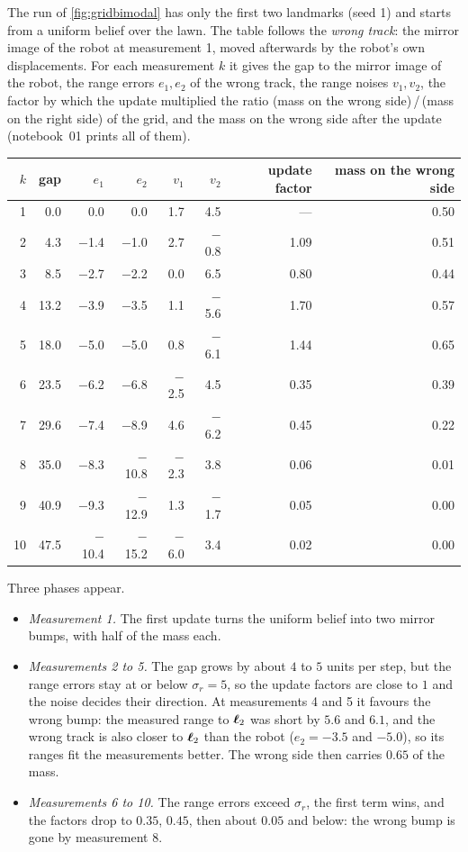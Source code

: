 The run of \cref{fig:gridbimodal} has only the first two landmarks
(seed 1) and starts from a uniform belief over the lawn. The table
follows the \emph{wrong track}: the mirror image of the robot at
measurement 1, moved afterwards by the robot's own displacements. For
each measurement $k$ it gives the gap to the mirror image of the robot,
the range errors $e_1,e_2$ of the wrong track, the range noises
$v_1,v_2$, the factor by which the update multiplied the ratio (mass on
the wrong side)\,/\,(mass on the right side) of the grid, and the mass on
the wrong side after the update (notebook~01 prints all of them).
\begin{center}
\small
\begin{tabular}{@{}rrrrrrrr@{}}
\toprule
$k$ & gap & $e_1$ & $e_2$ & $v_1$ & $v_2$ & update factor &
mass on the wrong side\\
\midrule
 1 &  0.0 &   0.0 &   0.0 &  1.7 &  4.5 & ---  & 0.50\\
 2 &  4.3 &  $-$1.4 &  $-$1.0 &  2.7 & $-$0.8 & 1.09 & 0.51\\
 3 &  8.5 &  $-$2.7 &  $-$2.2 &  0.0 &  6.5 & 0.80 & 0.44\\
 4 & 13.2 &  $-$3.9 &  $-$3.5 &  1.1 & $-$5.6 & 1.70 & 0.57\\
 5 & 18.0 &  $-$5.0 &  $-$5.0 &  0.8 & $-$6.1 & 1.44 & 0.65\\
 6 & 23.5 &  $-$6.2 &  $-$6.8 & $-$2.5 &  4.5 & 0.35 & 0.39\\
 7 & 29.6 &  $-$7.4 &  $-$8.9 &  4.6 & $-$6.2 & 0.45 & 0.22\\
 8 & 35.0 &  $-$8.3 & $-$10.8 & $-$2.3 &  3.8 & 0.06 & 0.01\\
 9 & 40.9 &  $-$9.3 & $-$12.9 &  1.3 & $-$1.7 & 0.05 & 0.00\\
10 & 47.5 & $-$10.4 & $-$15.2 & $-$6.0 &  3.4 & 0.02 & 0.00\\
\bottomrule
\end{tabular}
\end{center}
Three phases appear.
\begin{itemize}[nosep]
  \item \emph{Measurement 1.} The first update turns the uniform belief
        into two mirror bumps, with half of the mass each.
  \item \emph{Measurements 2 to 5.} The gap grows by about $4$ to $5$
        units per step, but the range errors stay at or below
        $\sigma_r=5$, so the update factors are close to $1$ and the
        noise decides their direction. At measurements 4 and 5 it
        favours the wrong bump: the measured range to $\bm{\ell}_2$ was short
        by $5.6$ and $6.1$, and the wrong track is also closer to
        $\bm{\ell}_2$ than the robot ($e_2=-3.5$ and $-5.0$), so its ranges
        fit the measurements better. The wrong side then carries $0.65$ of
        the mass.
  \item \emph{Measurements 6 to 10.} The range errors exceed $\sigma_r$,
        the first term wins, and the factors drop to $0.35$, $0.45$,
        then about $0.05$ and below: the wrong bump is gone by
        measurement 8.
\end{itemize}

